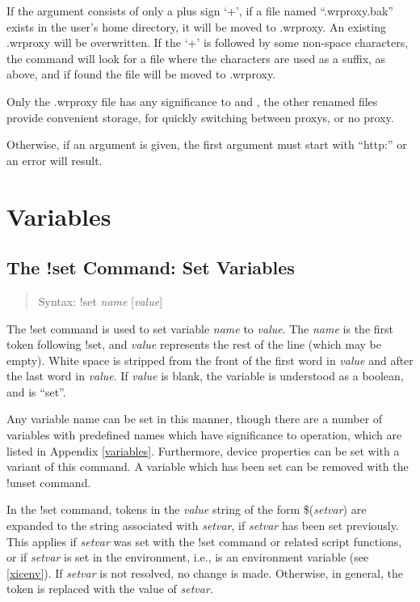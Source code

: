 If the argument consists of only a plus sign `{\vt +}', if a file
named ``{\vt .wrproxy.bak}'' exists in the user's home directory, it
will be moved to {\vt .wrproxy}.  An existing {\vt .wrproxy} will be
overwritten.  If the `{\vt +}' is followed by some non-space
characters, the command will look for a file where the characters are
used as a suffix, as above, and if found the file will be moved to
{\vt .wrproxy}.

Only the {\vt .wrproxy} file has any significance to {\Xic} and
{\WRspice}, the other renamed files provide convenient storage, for
quickly switching between proxys, or no proxy.

Otherwise, if an argument is given, the first argument must start with
``{\vt http:}'' or an error will result.

\section{Variables}
\label{setcmd}

\subsection{The {\cb !set} Command: Set Variables}
\begin{quote}
Syntax: {\vt !set} {\it name} [{\it value\/}]
\end{quote}
The {\cb !set} command is used to set variable {\it name} to {\it
value}.  The {\it name} is the first token following {\cb !set}, and
{\it value} represents the rest of the line (which may be empty). 
White space is stripped from the front of the first word in
{\it value} and after the last word in {\it value}.  If {\it value}
is blank, the variable is understood as a boolean, and is ``set''.

Any variable name can be set in this manner, though there are a number
of variables with predefined names which have significance to {\Xic}
operation, which are listed in Appendix \ref{variables}.  Furthermore,
device properties can be set with a variant of this command.  A
variable which has been set can be removed with the {\cb !unset}
command.

In the {\cb !set} command, tokens in the {\it value} string of the
form \$({\it setvar}) are expanded to the string associated with {\it
setvar}, if {\it setvar} has been set previously.  This applies if
{\it setvar} was set with the {\cb !set} command or related script
functions, or if {\it setvar} is set in the environment, i.e., is an
environment variable (see \ref{xicenv}).  If {\it setvar} is not
resolved, no change is made.  Otherwise, in general, the token is
replaced with the value of {\it setvar}.

